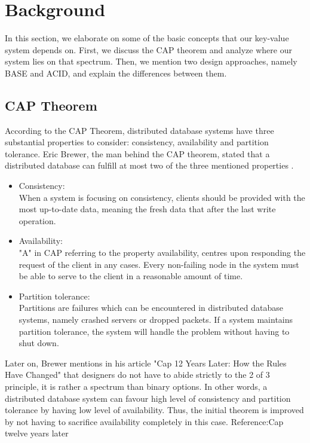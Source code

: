 \section{Background}
\label{sec:background}
In this section, we elaborate on some of the basic concepts that our key-value system depends on. First, we discuss the CAP theorem and analyze where our system lies on that spectrum. Then, we mention two design approaches, namely BASE and ACID, and explain the differences between them.

\subsection{CAP Theorem}
\label{sec:backgorund_cap}  %
According to the CAP Theorem, distributed database systems have three substantial properties to consider: consistency, availability and partition tolerance. Eric Brewer, the man behind the CAP theorem, stated that a distributed database can fulfill at most two of the three mentioned properties \cite{brewer_cap}.

\begin{itemize}
  \item Consistency: \\
  When a system is focusing on consistency, clients should be provided with the most up-to-date data, meaning the fresh data that after the last write operation.
  \item Availability:\\
  "A" in CAP referring to the property availability, centres upon responding the request of the client in any cases. Every non-failing node in the system must be able to serve to the client in a reasonable amount of time.
  \item Partition tolerance:\\
Partitions are failures which can be encountered in distributed database systems, namely crashed servers or dropped packets. If a system maintains partition tolerance, the system will handle the problem without having to shut down.
\end{itemize}

Later on, Brewer mentions in his article "Cap 12 Years Later: How the Rules Have Changed" that designers do not have to abide strictly to the 2 of 3 principle, it is rather a spectrum than binary options. In other words, a distributed database system can favour high level of consistency and partition tolerance by having low level of availability. Thus, the initial theorem is improved by not having to sacrifice availability completely in this case. Reference:Cap twelve years later

